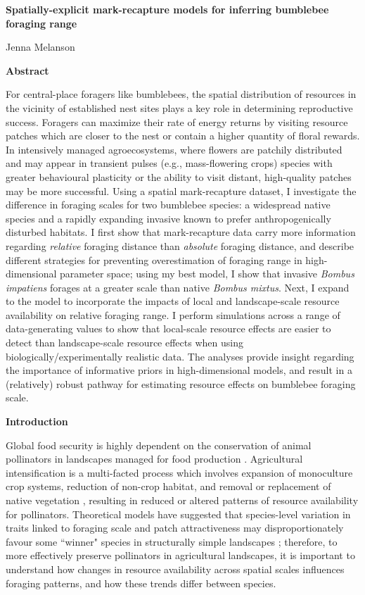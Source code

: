 \documentclass[11pt]{article}
\begin{document}
\setcounter{page}{1}
\begin{center}
\textbf{Spatially-explicit mark-recapture models for inferring bumblebee foraging range}

Jenna Melanson
\end{center}

\noindent \textbf{Abstract}

 For central-place foragers like bumblebees, the spatial distribution of resources in the vicinity of established nest sites plays a key role in determining reproductive success. Foragers can maximize their rate of energy returns by visiting resource patches which are closer to the nest or contain a higher quantity of floral rewards. In intensively managed agroecosystems, where flowers are patchily distributed and may appear in transient pulses (e.g., mass-flowering crops) species with greater behavioural plasticity or the ability to visit distant, high-quality patches may be more successful. Using a spatial mark-recapture dataset, I investigate the difference in foraging scales for two bumblebee species: a widespread native species and a rapidly expanding invasive known to prefer anthropogenically disturbed habitats. I first show that mark-recapture data carry more information regarding \emph{relative} foraging distance than \emph{absolute} foraging distance, and describe different strategies for preventing overestimation of foraging range in high-dimensional parameter space; using my best model, I show that invasive \emph{Bombus impatiens} forages at a greater scale than native \emph{Bombus mixtus}. Next, I expand to the model to incorporate the impacts of local and landscape-scale resource availability on relative foraging range. I perform simulations across a range of data-generating values to show that local-scale resource effects are easier to detect than landscape-scale resource effects when using biologically/experimentally realistic data. The analyses provide insight regarding the importance of informative priors in high-dimensional models, and result in a (relatively) robust pathway for estimating resource effects on bumblebee foraging scale.


\noindent \textbf{Introduction}

Global food security is highly dependent on the conservation of animal pollinators in landscapes managed for food production \parencite{kremen_crop_2002, eilers_contribution_2011}. Agricultural intensification is a multi-facted process which involves expansion of monoculture crop systems, reduction of non-crop habitat, and removal or replacement of native vegetation \parencite{emmerson_chapter_2016}, resulting in reduced or altered patterns of resource availability for pollinators. Theoretical models have suggested that species-level variation in traits linked to foraging scale and patch attractiveness may disproportionately favour some ``winner" species in structurally simple landscapes \parencite{bolin_scaledependent_2018}; therefore, to more effectively preserve pollinators in agricultural landscapes, it is important to understand how changes in resource availability across spatial scales influences foraging patterns, and how these trends differ between species.
 
\end{document}
